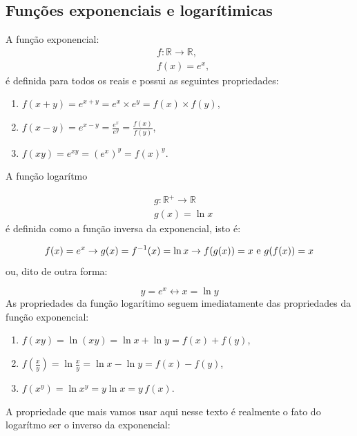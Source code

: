 \documentclass{article}
\begin{document}
\subsection{Fun\c c\~oes exponenciais e logar\'itimicas}

A fun\c c\~ao exponencial:
\begin{equation}
\begin{split}
&f:\mathbb{R}\rightarrow \mathbb{R},\\
&f(x) = e^x,
\end{split}
\end{equation}
\'e definida para todos os reais e possui as seguintes propriedades:

\begin{enumerate}
\item $f(x+y)= e^{x+y} = e^x\times e^y = f(x)\times f(y)$,
\item $f(x-y) = e^{x-y}= \frac{e^x}{e^y} = \frac{f(x)}{f(y)}$,
\item $f(xy) = e^{xy} = (e^x)^y = f(x)^y$.
\end{enumerate}

A fun\c c\~ao logar\'itmo

\begin{equation}
\begin{split}
&g:\mathbb{R}^+\rightarrow \mathbb{R}\\
&g(x) = \ln x
\end{split}
\end{equation}
 \'e definida como a fun\c c\~ao inversa da exponencial, isto \'e:

\begin{equation}
f(x) = e^x \rightarrow g(x) = f^{-1}(x) = \ln x \rightarrow f(g(x)) = x\text{ e }g(f(x)) = x\\
\end{equation}
ou, dito de outra forma:

\begin{equation}
y = e^x \leftrightarrow x = \ln y
\end{equation}
As propriedades da fun\c c\~ao logar\'itimo seguem imediatamente das propriedades da fun\c c\~ao exponencial:

\begin{enumerate}
\item $f(xy) = \ln(xy) = \ln x + \ln y = f(x) + f(y)$,
\item $f(\frac{x}{y}) = \ln\frac{x}{y} = \ln x - \ln y = f(x) - f(y)$,
\item $f(x^y) = \ln x^y = y\ln x = y\, f(x)$.
\end{enumerate}
A propriedade que mais vamos usar aqui nesse texto \'e realmente o fato do logar\'itmo ser o inverso da exponencial:
\end{document}
